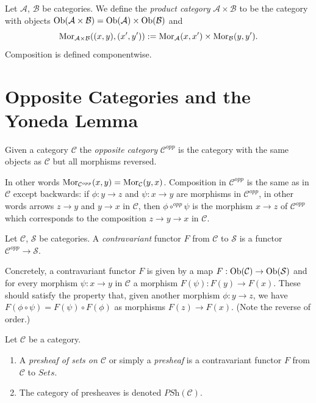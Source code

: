 \begin{definition}
\label{definition-product-category}
Let $\mathcal{A}$, $\mathcal{B}$ be categories.
We define the {\it product category}
$\mathcal{A} \times \mathcal{B}$ to be the category with
objects
$\mathop{\mathrm{Ob}}\nolimits(\mathcal{A} \times \mathcal{B}) =
\mathop{\mathrm{Ob}}\nolimits(\mathcal{A}) \times \mathop{\mathrm{Ob}}\nolimits(\mathcal{B})$
and
$$
\mathop{\mathrm{Mor}}\nolimits_{\mathcal{A} \times \mathcal{B}}((x, y), (x', y'))
:=
\mathop{\mathrm{Mor}}\nolimits_\mathcal{A}(x, x')\times
\mathop{\mathrm{Mor}}\nolimits_\mathcal{B}(y, y').
$$
Composition is defined componentwise.
\end{definition}


\section{Opposite Categories and the Yoneda Lemma}
\label{section-opposite}

\begin{definition}
\label{definition-opposite}
Given a category $\mathcal{C}$ the {\it opposite category}
$\mathcal{C}^{opp}$ is the category with the same objects
as $\mathcal{C}$ but all morphisms reversed.
\end{definition}

\noindent
In other words
$\mathop{\mathrm{Mor}}\nolimits_{\mathcal{C}^{opp}}(x, y) = \mathop{\mathrm{Mor}}\nolimits_\mathcal{C}(y, x)$.
Composition in $\mathcal{C}^{opp}$ is the same as in $\mathcal{C}$
except backwards: if $\phi : y \to z$ and $\psi : x \to y$
are morphisms in $\mathcal{C}^{opp}$, in other words arrows
$z \to y$ and $y \to x$ in $\mathcal{C}$,
then $\phi \circ^{opp} \psi$ is the morphism $x \to z$
of $\mathcal{C}^{opp}$ which corresponds to the composition
$z \to y \to x$ in $\mathcal{C}$.

\begin{definition}
\label{definition-contravariant}
Let $\mathcal{C}$, $\mathcal{S}$ be categories.
A {\it contravariant} functor $F$
from $\mathcal{C}$ to $\mathcal{S}$
is a functor $\mathcal{C}^{opp}\to \mathcal{S}$.
\end{definition}

\noindent
Concretely, a contravariant functor $F$ is given
by a map $F : \mathop{\mathrm{Ob}}\nolimits(\mathcal{C}) \to
\mathop{\mathrm{Ob}}\nolimits(\mathcal{S})$ and for every morphism
$\psi : x \to y$ in $\mathcal{C}$ a morphism
$F(\psi) : F(y) \to F(x)$. These should satisfy the property
that, given another morphism
$\phi : y \to z$, we have $F(\phi \circ \psi)
= F(\psi) \circ F(\phi)$ as morphisms $F(z) \to F(x)$.
(Note the reverse of order.)

\begin{definition}
\label{definition-presheaf}
Let $\mathcal{C}$ be a category.
\begin{enumerate}
\item A {\it presheaf of sets on $\mathcal{C}$}
or simply a {\it presheaf} is a contravariant functor
$F$ from $\mathcal{C}$ to $\textit{Sets}$.
\item The category of presheaves is denoted $\textit{PSh}(\mathcal{C})$.
\end{enumerate}
\end{definition}

